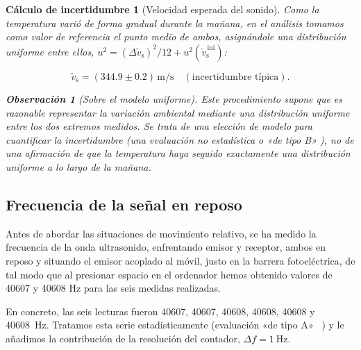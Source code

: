\documentclass[a4paper,11pt]{amsart}
\numberwithin{equation}{section}
\newcommand{\vst}{\tilde{v}_{\mathrm{s}}}     %
\theoremstyle{cienplano}
\theoremstyle{ciendef}
\newtheorem{calculo}[proposicion]{Cálculo de incertidumbre}
\theoremstyle{cienobs}
\newtheorem{observacion}[proposicion]{Observación}
\newcounter{referencia}
\begin{document}
\begin{calculo}[Velocidad esperada del sonido]
Como la temperatura varió de forma gradual durante la mañana, en el análisis
tomamos como valor de referencia el punto medio de ambos, asignándole una
distribución uniforme entre ellos, $u^{2}=(\Delta\vst)^{2}/12+u^{2}(\vst^{\,\mathrm{ini}})$:
\begin{destacado}
\begin{equation}\label{eq:vsref}
  \vst=(\num{344,9}\pm\num{0,2})\,\si{\meter\per\second}
  \quad(\text{incertidumbre típica}).
\end{equation}
\end{destacado}
\begin{observacion}[Sobre el modelo uniforme]\label{obs:uniforme}
Este procedimiento supone que es razonable representar la variación ambiental
mediante una distribución uniforme entre los dos extremos medidos. Se trata de
una \emph{elección de modelo} para cuantificar la incertidumbre (una evaluación no estadística o «de tipo B» \cite{NUM-ARG}), no de una afirmación de que la temperatura haya
seguido exactamente una distribución uniforme a lo largo de la mañana.
\end{observacion}
\end{calculo}
\subsection{Frecuencia de la señal en reposo}
Antes de abordar las situaciones de movimiento relativo, se ha medido la frecuencia de la onda ultrasonido, enfrentando emisor y receptor, ambos en reposo y situando el emisor acoplado al móvil, justo en la barrera fotoeléctrica, de tal modo que al presionar espacio en el ordenador hemos obtenido valores de 40607 y 40608 Hz para las seis medidas realizadas.

En concreto, las seis lecturas fueron 40607, 40607, 40608, 40608, 40608 y
40608~Hz. Tratamos esta serie estadísticamente (evaluación «de tipo A» ~\cite{NUM-ARG,ERR-MP}) y le añadimos la contribución de la
resolución del contador, $\Delta f=\SI{1}{\hertz}$.
\end{document}
